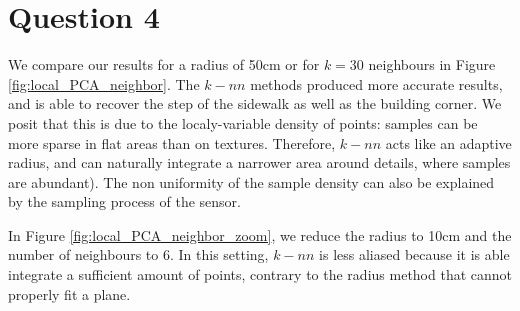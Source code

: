 \documentclass[a4paper]{article}
\begin{document}
\section*{Question 4}

We compare our results for a radius of 50cm or for $k=30$ neighbours in Figure \ref{fig:local_PCA_neighbor}. The $k-nn$ methods 
produced more accurate results, and is able to recover the step of the sidewalk as well as the building corner. We posit that this is due
to the localy-variable density of points: samples can be more sparse in flat areas than on textures. Therefore, $k-nn$ acts like
an adaptive radius, and can naturally integrate a narrower area around details, where samples are abundant). The non uniformity of the
sample density can also be explained by the sampling process of the sensor.

In Figure \ref{fig:local_PCA_neighbor_zoom}, we reduce the radius to 10cm and the number of neighbours to 6. In this setting, $k-nn$ is less
aliased because it is able integrate a sufficient amount of points, contrary to the radius method that cannot properly fit a plane.



\end{document}
